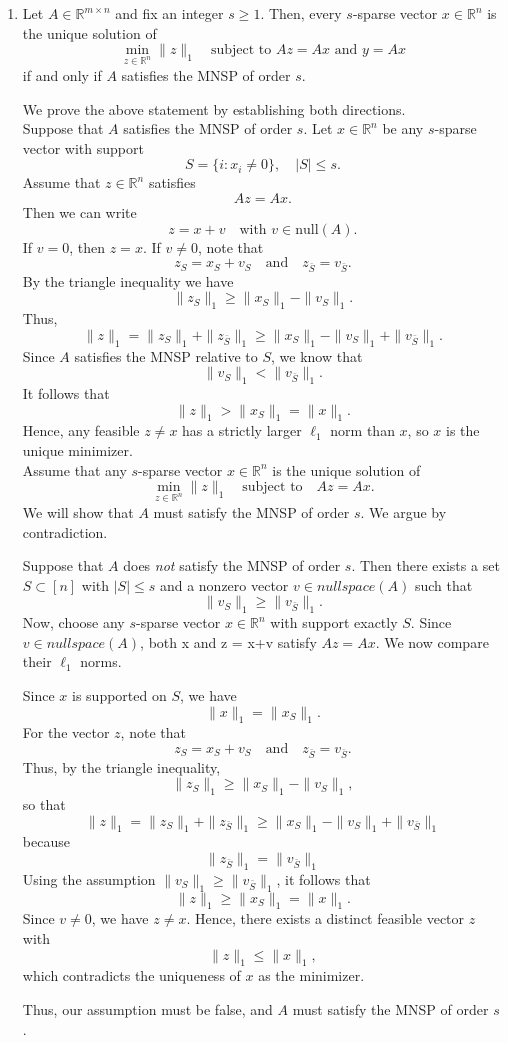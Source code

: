 \documentclass{article}
\begin{document}
\begin{enumerate}
\begin{enumerate}
\item 
Let $A\in\mathbb{R}^{m\times n}$ and fix an integer $s\ge 1$. Then, every $s$-sparse vector $x\in\mathbb{R}^n$ is the unique solution of
\[
\min_{z\in\mathbb{R}^n} \|z\|_1 \quad\text{subject to } Az=Ax\text{ and } y=Ax
\]
if and only if $A$ satisfies the MNSP of order $s$.

We prove the above statement by establishing both directions.\\
Suppose that $A$ satisfies the MNSP of order $s$. Let $x\in\mathbb{R}^n$ be any $s$-sparse vector with support
\[
S = \{i : x_i\neq 0\}, \quad |S|\le s.
\]
Assume that $z\in\mathbb{R}^n$ satisfies
\[
Az = Ax.
\]
Then we can write
\[
z = x + v \quad \text{with } v\in \mathrm{null}(A).
\]
If $v=0$, then $z=x$. If $v\neq 0$, note that
\[
z_S = x_S + v_S \quad \text{and} \quad z_{\bar{S}} = v_{\bar{S}}.
\]
By the triangle inequality we have
\[
\|z_S\|_1 \ge \|x_S\|_1 - \|v_S\|_1.
\]
Thus,
\[
\|z\|_1 = \|z_S\|_1 + \|z_{\bar{S}}\|_1 \ge \|x_S\|_1 - \|v_S\|_1 + \|v_{\bar{S}}\|_1.
\]
Since $A$ satisfies the MNSP relative to $S$, we know that
\[
\|v_S\|_1 < \|v_{\bar{S}}\|_1.
\]
It follows that
\[
\|z\|_1 > \|x_S\|_1 = \|x\|_1.
\]
Hence, any feasible $z\neq x$ has a strictly larger $\ell_1$ norm than $x$, so $x$ is the unique minimizer.
\\
Assume that any $s$-sparse vector $x\in\mathbb{R}^n$ is the unique solution of
\[
\min_{z\in\mathbb{R}^n}\|z\|_1 \quad \text{subject to} \quad Az = Ax.
\]
We will show that $A$ must satisfy the MNSP of order $s$. We argue by contradiction.

Suppose that $A$ does \emph{not} satisfy the MNSP of order $s$. Then there exists a set $S\subset [n]$ with $|S|\le s$ and a nonzero vector $v\in nullspace(A)$ such that
\[
\|v_S\|_1 \ge \|v_{\bar{S}}\|_1.
\]
Now, choose any $s$-sparse vector $x\in\mathbb{R}^n$ with support exactly $S$. Since $v\in nullspace(A)$, both x and z = x+v
satisfy $Az = Ax$. We now compare their $\ell_1$ norms.

Since $x$ is supported on $S$, we have
\[
\|x\|_1 = \|x_S\|_1.
\]
For the vector $z$, note that
\[
z_S = x_S+v_S\quad \text{and}\quad z_{\bar{S}} = v_{\bar{S}}.
\]
Thus, by the triangle inequality,
\[
\|z_S\|_1 \ge \|x_S\|_1 - \|v_S\|_1,
\]
so that
\[
\|z\|_1 = \|z_S\|_1 + \|z_{\bar{S}}\|_1 \ge \|x_S\|_1 - \|v_S\|_1 + \|v_{\bar{S}}\|_1
\]
because \[ \|z_{\bar{S}}\|_1 = \|v_{\bar{S}}\|_1 \]
Using the assumption $\|v_S\|_1 \ge \|v_{\bar{S}}\|_1$, it follows that
\[
\|z\|_1 \ge \|x_S\|_1 = \|x\|_1.
\]
Since $v\neq 0$, we have $z\neq x$. Hence, there exists a distinct feasible vector $z$ with
\[
\|z\|_1 \le \|x\|_1,
\]
which contradicts the uniqueness of $x$ as the minimizer. 

Thus, our assumption must be false, and $A$ must satisfy the MNSP of order $s$.
\end{enumerate}
\end{enumerate}
\end{document}
